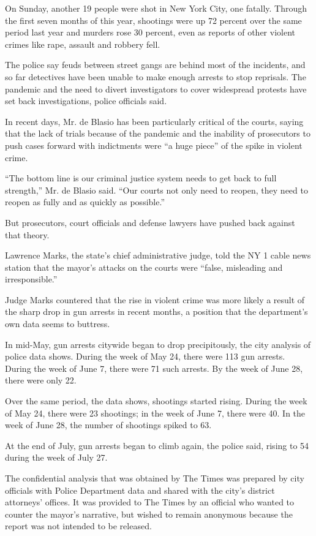 On Sunday, another 19 people were shot in New York City, one fatally.
Through the first seven months of this year, shootings were up 72
percent over the same period last year and murders rose 30 percent, even
as reports of other violent crimes like rape, assault and robbery fell.

The police say feuds between street gangs are behind most of the
incidents, and so far detectives have been unable to make enough arrests
to stop reprisals. The pandemic and the need to divert investigators to
cover widespread protests have set back investigations, police officials
said.

In recent days, Mr. de Blasio has been particularly critical of the
courts, saying that the lack of trials because of the pandemic and the
inability of prosecutors to push cases forward with indictments were ``a
huge piece'' of the spike in violent crime.

``The bottom line is our criminal justice system needs to get back to
full strength,'' Mr. de Blasio said. ``Our courts not only need to
reopen, they need to reopen as fully and as quickly as possible.''

But prosecutors, court officials and defense lawyers have pushed back
against that theory.

Lawrence Marks, the state's chief administrative judge, told the NY 1
cable news station that the mayor's attacks on the courts were ``false,
misleading and irresponsible.''

Judge Marks countered that the rise in violent crime was more likely a
result of the sharp drop in gun arrests in recent months, a position
that the department's own data seems to buttress.

In mid-May, gun arrests citywide began to drop precipitously, the city
analysis of police data shows. During the week of May 24, there were 113
gun arrests. During the week of June 7, there were 71 such arrests. By
the week of June 28, there were only 22.

Over the same period, the data shows, shootings started rising. During
the week of May 24, there were 23 shootings; in the week of June 7,
there were 40. In the week of June 28, the number of shootings spiked to
63.

At the end of July, gun arrests began to climb again, the police said,
rising to 54 during the week of July 27.

The confidential analysis that was obtained by The Times was prepared by
city officials with Police Department data and shared with the city's
district attorneys' offices. It was provided to The Times by an official
who wanted to counter the mayor's narrative, but wished to remain
anonymous because the report was not intended to be released.

